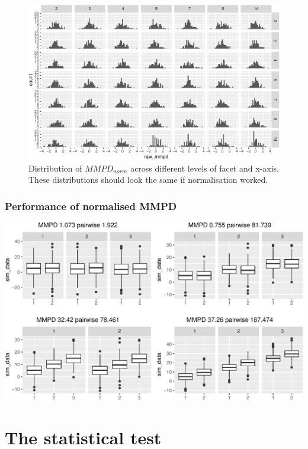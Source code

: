 \documentclass[
]{article}
\begin{document}
\begin{figure}

{\centering \includegraphics[width=\textwidth]{figure/norm-data-1} 

}

\caption{Distribution of $MMPD_{norm}$ across different levels of facet and x-axis. These distributions should look the same if normalisation worked.}\label{fig:norm-data}
\end{figure}

\hypertarget{performance-of-normalised-mmpd}{%
\subsubsection{Performance of normalised MMPD}\label{performance-of-normalised-mmpd}}

\begin{center}\includegraphics[width=\textwidth]{figure/unnamed-chunk-4-1} \end{center}

\hypertarget{the-statistical-test}{%
\section{The statistical test}\label{the-statistical-test}}
\end{document}

